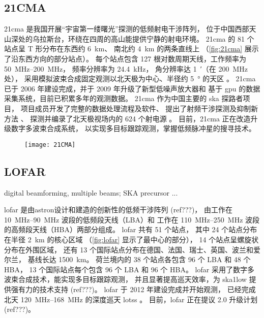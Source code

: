 \subsection{21CMA}

\acf{21cma} 是我国开展“宇宙第一缕曙光”探测的低频射电干涉阵列，
位于中国西部天山深处的乌拉斯台，环绕在四周的高山能提供宁静的射电环境。
\acs{21cma} 的 81 个站点呈 T 形分布在东西约 \SI{6}{\km}、
南北约 \SI{4}{\km} 的两条直线上
（\autoref{fig:21cma} 展示了沿东西方向的部分站点）。
每个站点包含 127 根对数周期天线，工作频率为 \SIrange{50}{200}{\MHz}，
频率分辨率为 \SI{24.4}{\kHz}，
角分辨率达 \SI{1}{\arcminute}（在 \SI{200}{\MHz} 处），
采用模拟波束合成固定观测以北天极为中心、半径约 \SI{5}{\degree} 的天区
\cite{wang2013,zheng2016}。
\acs{21cma} 已于 2006 年建设完成，并于 2009 年升级了新型低噪声放大器和
基于 \acs{gpu} 的数据采集系统，目前已积累多年的观测数据。
\acs{21cma} 作为中国主要的 \acs{ska} 探路者项目，
项目成员开发了完整的数据处理流程及软件、
提出了射频干涉探测及抑制新方法 \cite{huang2016}、
探测并编录了北天极视场内的 624 个射电源 \cite{zheng2016}。
目前，\acs{21cma} 正在改造升级数字多波束合成系统，
以实现多目标跟踪观测，掌握低频脉冲星的搜寻技术。

\begin{figure}[!htb]
  \centering
  \texttt{[image: 21CMA]}
  \label{fig:21cma}
\end{figure}

\subsection{LOFAR}

digital beamforming, multiple beams; SKA precursor ...

\acf{lofar} 是由\ac{astron}设计和建造的创新性的低频干涉阵列
\cite{vanHaarlem2013} (ref???)，
由工作在 \SIrange{10}{90}{\MHz} 波段的低频段天线（LBA）和
工作在 \SIrange{110}{250}{\MHz} 波段的高频段天线（HBA）两部分组成。
\acs{lofar} 共有 51 个站点，
其中 24 个站点分布在半径 \SI{2}{\km} 的核心区域
（\autoref{fig:lofar} 显示了最中心的部分），
14 个站点呈螺旋状分布在外围区域，
还有 13 个国际站点分布在德国、法国、瑞士、英国、波兰和爱尔兰，
基线长达 \SI{1500}{\km}。
荷兰境内的 38 个站点各包含 96 个 LBA 和 48 个 HBA，
13 个国际站点每个包含 96 个 LBA 和 96 个 HBA。
\acs{lofar} 采用了数字多波束合成技术，能实现多目标跟踪观测，
并且显著提高巡天效率，为 \acs{ska1low} 提供强有力的技术支持
\cite{vanHaarlem2013} (ref???)。
\acs{lofar} 于 2012 年建设完成并开始观测，
已经完成北天 \SIrange{120}{168}{\MHz} 的深度巡天
\ac{lotss} \cite{shimwell2017}。
目前，\acs{lofar} 正在提议 2.0 升级计划 (ref???)。

